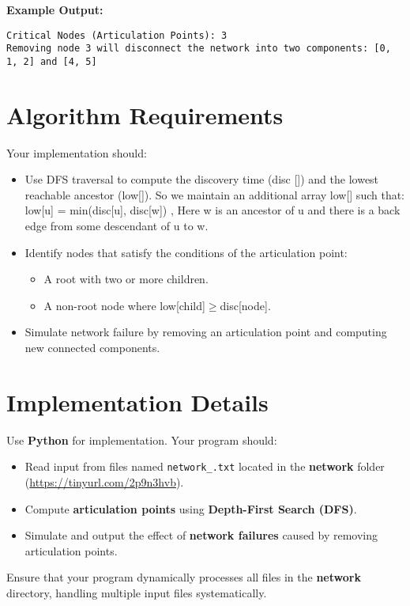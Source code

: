 \documentclass{article}
\begin{document}
\textbf{Example Output:}
\begin{verbatim}
Critical Nodes (Articulation Points): 3
Removing node 3 will disconnect the network into two components: [0, 1, 2] and [4, 5]
\end{verbatim}
\section{Algorithm Requirements}
Your implementation should:
\begin{itemize}
    \item Use DFS traversal to compute the discovery time (disc []) and the lowest reachable ancestor (low[]). So we maintain an additional array low[] such that:
low[u] = min(disc[u], disc[w]) , Here w is an ancestor of u and there is a back edge from some descendant of u to w.
    \item Identify nodes that satisfy the conditions of the articulation point: \begin{itemize}
            \item A root with two or more children.
            \item A non-root node where low[child]$\ge$disc[node].
          \end{itemize}
    \item Simulate network failure by removing an articulation point and computing new connected components.
\end{itemize}

\section{Implementation Details}
Use \textbf{Python} for implementation. Your program should:

\begin{itemize}
    \item Read input from files named \texttt{network\_<file number>.txt} located in the \textbf{network} folder (\url{https://tinyurl.com/2p9n3hvb}).
    \item Compute \textbf{articulation points} using \textbf{Depth-First Search (DFS)}.
    \item Simulate and output the effect of \textbf{network failures} caused by removing articulation points.
\end{itemize}

Ensure that your program dynamically processes all files in the \textbf{network} directory, handling multiple input files systematically.
\end{document}

